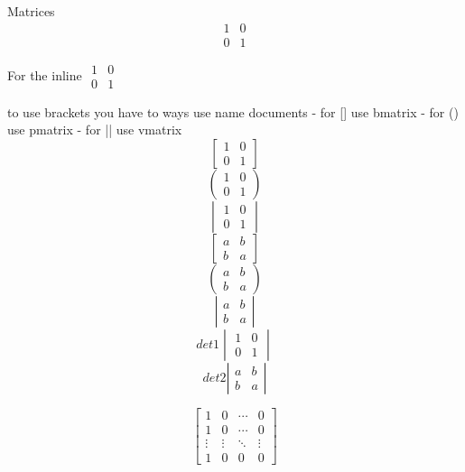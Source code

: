 \documentclass[12pt]{article}
\begin{document}
 Matrices
\[
\begin{matrix} 1 & 0 \\ 0 & 1 \end{matrix}
\]

For the inline $ \begin{matrix} 1 & 0 \\ 0 & 1 \end{matrix} $

to use brackets you have to ways \newline
use name documents - for [] use {bmatrix} - for () use {pmatrix} - for || use {vmatrix}
\[ \begin{bmatrix} 1 & 0 \\ 0 & 1 \end{bmatrix} \] 
\[ \begin{pmatrix} 1 & 0 \\ 0 & 1 \end{pmatrix} \]
\[ \begin{vmatrix} 1 & 0 \\ 0 & 1 \end{vmatrix} \]
\[ \left[ \begin{matrix} a & b \\ b & a \end{matrix} \right] \]
\[ \left( \begin{matrix} a & b \\ b & a \end{matrix} \right) \]
\[ \left| \begin{matrix} a & b \\ b & a \end{matrix} \right| \]
\[ det1{\begin{vmatrix} 1 & 0 \\ 0 & 1 \end{vmatrix}} \]
\[ det2{\left| \begin{matrix} a & b \\ b & a \end{matrix} \right|} \]


\[
 \begin{bmatrix}
  1 & 0 & \cdots & 0 \\
  1 & 0 & \cdots & 0 \\
  \vdots & \vdots & \ddots & \vdots \\
  1 & 0 & 0 & 0
 \end{bmatrix}
\]
\end{document}
